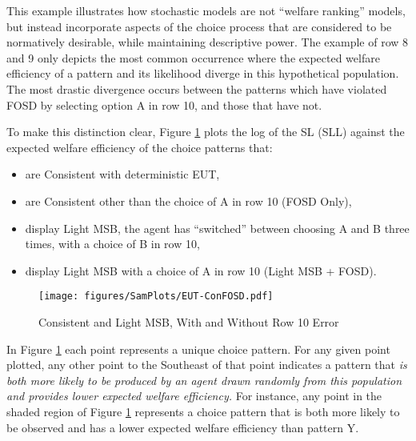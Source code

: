 \documentclass[../main.tex]{subfiles}
\begin{document}
This example illustrates how stochastic models are not \enquote{welfare ranking} models, but instead incorporate aspects of the choice process that are considered to be normatively desirable, while maintaining descriptive power.
The example of row 8 and 9 only depicts the most common occurrence where the expected welfare efficiency of a pattern and its likelihood diverge in this hypothetical population.
The most drastic divergence occurs between the patterns which have violated FOSD by selecting option A in row 10, and those that have not.

To make this distinction clear, Figure \ref{fig:ConFOSD} plots the log of the SL (SLL) against the expected welfare efficiency of the choice patterns that:
\begin{itemize}
 \setlength\itemsep{-.5em}
	\item are Consistent with deterministic EUT,
	\item are Consistent other than the choice of A in row 10 (FOSD Only),
	\item display Light MSB, the agent has \enquote{switched} between choosing A and B three times, with a choice of B in row 10,
	\item display Light MSB with a choice of A in row 10 (Light MSB + FOSD).
\end{itemize}

\begin{figure}[h!]
	\caption{Consistent and Light MSB, With and Without Row 10 Error}
	\texttt{[image: figures/SamPlots/EUT-ConFOSD.pdf]}
	\label{fig:ConFOSD}
\end{figure}

In Figure \ref{fig:ConFOSD} each point represents a unique choice pattern.
For any given point plotted, any other point to the Southeast of that point indicates a pattern that \textit{is both more likely to be produced by an agent drawn randomly from this population and provides lower expected welfare efficiency.}
For instance, any point in the shaded region of Figure \ref{fig:ConFOSD} represents a choice pattern that is both more likely to be observed and has a lower expected welfare efficiency than pattern Y.
\end{document}
